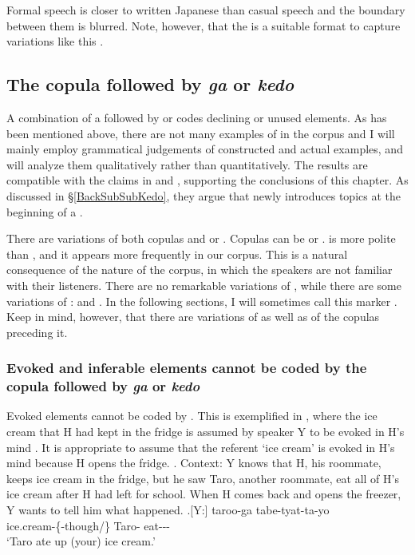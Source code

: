 Formal speech is closer to written Japanese than casual speech
and the boundary between them is blurred.
Note, however, that
the  is a suitable format to capture variations like this \cite[see][]{croft10}.

\subsection{The copula followed by \textit{ga} or \textit{kedo}}\label{kedo}

A combination of a  followed by  or 
codes declining or unused elements.
As has been mentioned above,
there are not many examples of  in the corpus
and I will mainly employ grammatical judgements of constructed and actual examples,
and will analyze them qualitatively rather than quantitatively.
The results are compatible with the claims in  and ,
supporting the conclusions of this chapter.
As discussed in \S \ref{BackSubSubKedo},
they argue that  newly introduces topics at the beginning of a .

There are variations of both copulas and  or .
Copulas can be  or .
 is more polite than ,
and it appears more frequently in our corpus.
This is a natural consequence of the nature of the corpus, in which the speakers are not familiar with their listeners.
There are no remarkable variations of ,
while there are some variations of :
 and .
In the following sections,
I will sometimes call this marker .
Keep in mind, however, that there are variations of  as well as of the copulas preceding it.

\subsubsection{Evoked and inferable elements cannot be coded by the copula followed by \textit{ga} or \textit{kedo}}

Evoked elements cannot be coded by .
This is exemplified in \Next,
where the ice cream that H had kept in the fridge is assumed by speaker Y to be evoked in H's mind .
It is appropriate to assume that the referent `ice cream' is evoked in H's mind
because H opens the fridge.
%
\ex. Context: Y knows that H, his roommate, keeps ice cream in the fridge,
	but he saw Taro, another roommate, eat all of H's ice cream after H had left for school.
	When H comes back and opens the freezer,
	Y wants to tell him what happened.
	\ag.[Y:]  taroo-ga tabe-tyat-ta-yo \\
		ice.cream-\{-though/\} Taro- eat--- \\
		`Taro ate up (your) ice cream.'

